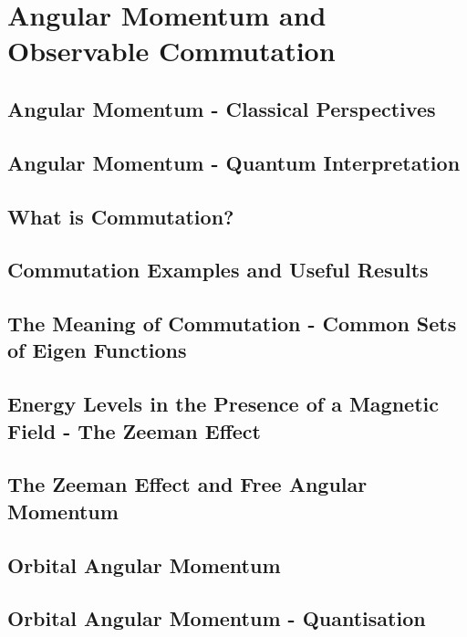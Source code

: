 \documentclass[../../Quantum-Technologies-Notes]{subfiles}
\begin{document}
	
	\ifSubfilesClassLoaded{ \pagestyle{fancy} }{}

	\section{Angular Momentum and Observable Commutation}
		
		\subsection{Angular Momentum - Classical Perspectives}
		
		
		\subsection{Angular Momentum - Quantum Interpretation}
		
		
		\subsection{What is Commutation?}
		
		
		\subsection{Commutation Examples and Useful Results}
		
		
		\subsection{The Meaning of Commutation - Common Sets of Eigen Functions}
		
		
		\subsection{Energy Levels in the Presence of a Magnetic Field - The Zeeman Effect}
		
		
		\subsection{The Zeeman Effect and Free Angular Momentum}
		
		
		\subsection{Orbital Angular Momentum}
		
		
		\subsection{Orbital Angular Momentum - Quantisation}
		
		
		\pagebreak
\end{document}
